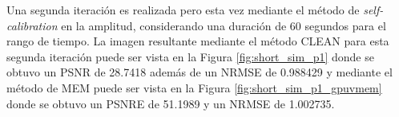 Una segunda iteración es realizada pero esta vez mediante el método de \textit{self-calibration} en la amplitud, considerando una duración de 60 segundos para el rango de tiempo. La imagen resultante mediante el método CLEAN para esta segunda iteración puede ser vista en la Figura \ref{fig:short_sim_p1} donde se obtuvo un PSNR de 28.7418 además de un NRMSE de 0.988429 y mediante el método de MEM puede ser vista en la Figura \ref{fig:short_sim_p1_gpuvmem} donde se obtuvo un PSNRE de 51.1989 y un NRMSE de 1.002735. 

\begin{figure}[!ht]
 \centering
\vspace{0.3cm}

\end{figure}
